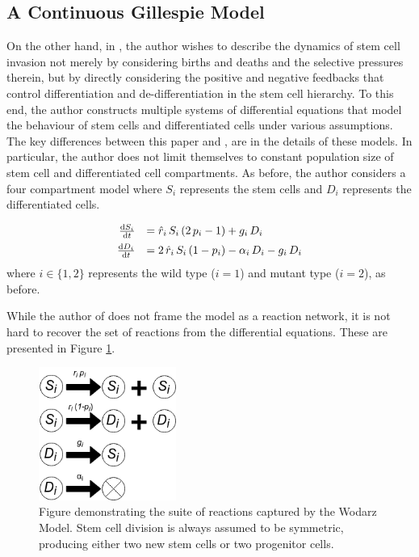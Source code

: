 \documentclass[12pt]{article}
\renewcommand{\d}{{\rm d}}
\begin{document}
\subsection{A Continuous Gillespie Model}
On the other hand, in \cite{wodarz}, the author wishes to describe the dynamics of stem cell invasion not merely by considering births and deaths and the selective pressures therein, but by directly considering the positive and negative feedbacks that control differentiation and de-differentiation in the stem cell hierarchy. To this end, the author constructs multiple systems of differential equations that model the behaviour of stem cells and differentiated cells under various assumptions. The key differences between this paper and \cite{mohammad}, are in the details of these models. In particular, the author does not limit themselves to constant population size of stem cell and differentiated cell compartments. As before, the author considers a four compartment model where $S_i$ represents the stem cells and $D_i$ represents the differentiated cells. 

\begin{equation}
\begin{array}{rl}
\frac{\d S_i}{\d t}&= \hat{r}_i\,S_i\,(2\,p_i-1)+g_i\,D_i\vspace*{5pt}\\
\frac{\d D_i}{\d t}&= 2\,\hat{r}_i\,S_i\,(1-p_i)-\alpha_i\,D_i-g_i\,D_i
\end{array}
\end{equation}\label{wodDE}
where $i\in\{1,2\}$ represents the wild type ($i=1$) and mutant type ($i=2$), as before.

While the author of \cite{wodarz} does not frame the model as a reaction network, it is not hard to recover the set of reactions from the differential equations. These are presented in Figure \ref{wodarzRxns}. 

\begin{figure}
\begin{center}
\includegraphics[width=0.4\textwidth]{wodarz-rxns.png}
\end{center}
\caption{Figure demonstrating the suite of reactions captured by the Wodarz Model. Stem cell division is always assumed to be symmetric, producing either two new stem cells or two progenitor cells.}\label{wodarzRxns}
\end{figure}
\end{document}
